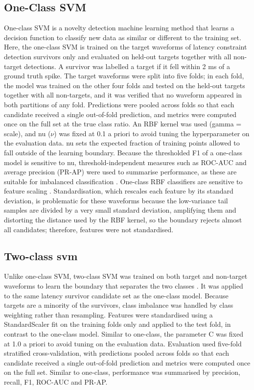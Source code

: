 \documentclass[ %
                    author={Daniel Page},
                supervisor={Dr. Andrew Calway},
                    degree={MSc},
                     title={Some Structural Guidelines for Data Science MSc Theses, Including Those With Long Titles that Run Across Multiple Lines on the Front Page},
                  subtitle={And those including an optional subtitle too, for good measure},
                      type={},
                      year={2021}]{dissertation}
\begin{document}
\subsection{One-Class SVM}
One-class SVM is a novelty detection machine learning method that learns a decision function to classify new data as similar or different to the training set. Here, the one-class SVM is trained on the target waveforms of latency constraint detection survivors only and evaluated on held-out targets together with all non-target detections. A survivor was labelled a target if it fell within 2 ms of a ground truth spike. The target waveforms were split into five folds; in each fold, the model was trained on the other four folds and tested on the held-out targets together with all non-targets, and it was verified that no waveform appeared in both partitions of any fold. Predictions were pooled across folds so that each candidate received a single out-of-fold prediction, and metrics were computed once on the full set at the true class ratio. An RBF kernel was used (gamma = scale), and nu ($\nu$) was fixed at 0.1 a priori to avoid tuning the hyperparameter on the evaluation data. nu sets the expected fraction of training points allowed to fall outside of the learning boundary. Because the thresholded F1 of a one-class model is sensitive to nu, threshold-independent measures such as ROC-AUC and average precision (PR-AP) were used to summarise performance, as these are suitable for imbalanced classification  \cite{campos_evaluation_2016}. One-class RBF classifiers are sensitive to feature scaling \cite{juszczak_feature_2002, feragen_adaptive_2015}. Standardisation, which rescales each feature by its standard deviation, is problematic for these waveforms because the low-variance tail samples are divided by a very small standard deviation, amplifying them and distorting the distance used by the RBF kernel, so the boundary rejects almost all candidates; therefore, features were not standardised. 
\subsection{Two-class svm}
Unlike one-class SVM, two-class SVM was trained on both target and non-target waveforms to learn the boundary that separates the two classes \cite{worheide_multi-omics_2021}. It was applied to the same latency survivor candidate set as the one-class model. Because targets are a minority of the survivors, class imbalance was handled by class weighting rather than resampling. Features were standardised using a StandardScaler fit on the training folds only and applied to the test fold, in contrast to the one-class model. Similar to one-class, the parameter C was fixed at 1.0 a priori to avoid tuning on the evaluation data.  Evaluation used five-fold stratified cross-validation, with predictions pooled across folds so that each candidate received a single out-of-fold prediction and metrics were computed once on the full set. Similar to one-class, performance was summarised by precision, recall, F1, ROC-AUC and PR-AP. 
\end{document}
